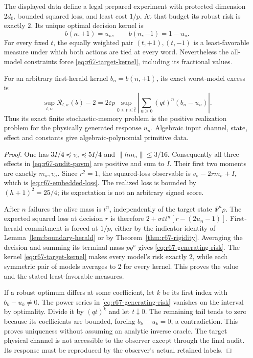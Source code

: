 \begin{theorem}\label{thm:r67-embedding}
The displayed data define a legal prepared experiment with protected dimension $2d_0$, bounded squared loss, and least cost $1/p$. At that budget its robust risk is exactly $2$. Its unique optimal decision kernel is
\begin{equation}\label{eq:r67-target-kernel}
 b(n,+1)=u_n,\qquad b(n,-1)=1-u_n.
\end{equation}
For every fixed $t$, the equally weighted pair $(t,+1),(t,-1)$ is a least-favorable measure under which both actions are tied at every word. Nevertheless the all-model constraints force \eqref{eq:r67-target-kernel}, including its fractional values.

For an arbitrary first-herald kernel $b_n=b(n,+1)$, its exact worst-model excess is
\begin{equation}\label{eq:r67-generating-risk}
 \sup_{t,\sigma}\mathcal R_{t,\sigma}(b)-2
  =2\varepsilon p\sup_{0\le t\le\bar t}
                \left|\sum_{n\ge0}(qt)^n(b_n-u_n)\right|.
\end{equation}
Thus its exact finite stochastic-memory problem is the positive realization problem for the physically generated response $u_n$. Algebraic input channel, state, effect and constants give algebraic-polynomial primitive data.
\end{theorem}
\begin{proof}
One has $3I/4\preccurlyeq v_\sigma\preccurlyeq5I/4$ and $\|hm_\sigma\|\le3/16$. Consequently all three effects in \eqref{eq:r67-audit-povm} are positive and sum to $I$. Their first two moments are exactly $m_\sigma,v_\sigma$. Since $r^2=1$, the squared-loss observable is $v_\sigma-2rm_\sigma+I$, which is \eqref{eq:r67-embedded-loss}. The realized loss is bounded by $(h+1)^2=25/4$; its expectation is not an arbitrary signed score.

After $n$ failures the alive mass is $t^n$, independently of the target state $\Psi^n\rho$. The expected squared loss at decision $r$ is therefore
$2+\sigma\varepsilon t^n[r-(2u_n-1)]$.
First-herald commitment is forced at $1/p$, either by the indicator identity of Lemma~\ref{lem:boundary-herald} or by Theorem~\ref{thm:r67-rigidity}. Averaging the decision and summing its terminal mass $pq^n$ gives \eqref{eq:r67-generating-risk}. The kernel \eqref{eq:r67-target-kernel} makes every model's risk exactly $2$, while each symmetric pair of models averages to $2$ for every kernel. This proves the value and the stated least-favorable measures.

If a robust optimum differs at some coefficient, let $k$ be its first index with $b_k-u_k\ne0$. The power series in \eqref{eq:r67-generating-risk} vanishes on the interval by optimality. Divide it by $(qt)^k$ and let $t\downarrow0$. The remaining tail tends to zero because its coefficients are bounded, forcing $b_k-u_k=0$, a contradiction. This proves uniqueness without assuming an analytic inverse oracle. The target physical channel is not accessible to the observer except through the final audit. Its response must be reproduced by the observer's actual retained labels.
\end{proof}


